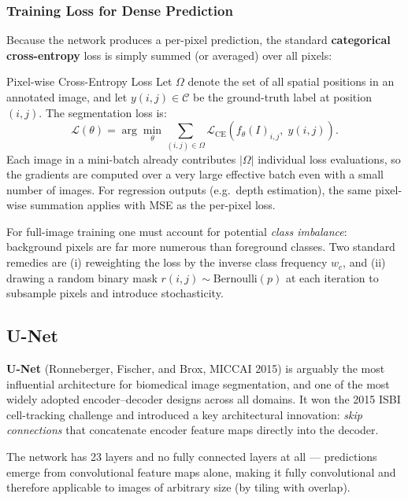 \documentclass[11pt,a4paper]{article}
\newcommand{\term}[1]{\textcolor{DefGreen}{\textbf{#1}}\index{#1}}
\begin{document}
\subsubsection{Training Loss for Dense Prediction}

Because the network produces a per-pixel prediction, the standard \term{categorical cross-entropy} loss is simply summed (or averaged) over all pixels:

\begin{defbox}{Pixel-wise Cross-Entropy Loss}
Let $\Omega$ denote the set of all spatial positions in an annotated image, and let $y(i,j) \in \mathcal{C}$ be the ground-truth label at position $(i,j)$. The segmentation loss is:
\[
  \mathcal{L}(\theta) = \arg\min_\theta \sum_{(i,j)\in\Omega} \mathcal{L}_{\text{CE}}\!\left(f_\theta(I)_{i,j},\; y(i,j)\right).
\]
Each image in a mini-batch already contributes $|\Omega|$ individual loss evaluations, so the gradients are computed over a very large effective batch even with a small number of images. For regression outputs (e.g.\ depth estimation), the same pixel-wise summation applies with MSE as the per-pixel loss.
\end{defbox}

For full-image training one must account for potential \emph{class imbalance}: background pixels are far more numerous than foreground classes. Two standard remedies are (i) reweighting the loss by the inverse class frequency $w_c$, and (ii) drawing a random binary mask $r(i,j) \sim \text{Bernoulli}(p)$ at each iteration to subsample pixels and introduce stochasticity.

\subsection{U-Net}
\label{sec:unet}

\term{U-Net} (Ronneberger, Fischer, and Brox, MICCAI 2015) is arguably the most influential architecture for biomedical image segmentation, and one of the most widely adopted encoder--decoder designs across all domains. It won the 2015 ISBI cell-tracking challenge and introduced a key architectural innovation: \emph{skip connections} that concatenate encoder feature maps directly into the decoder.

The network has 23 layers and no fully connected layers at all — predictions emerge from convolutional feature maps alone, making it fully convolutional and therefore applicable to images of arbitrary size (by tiling with overlap).
\end{document}
